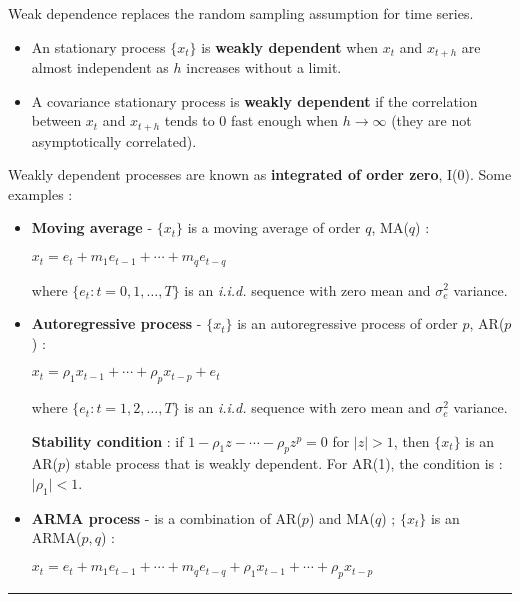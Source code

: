   \begin{f}

Weak dependence replaces the random sampling assumption for time series.

\begin{itemize}[leftmargin=*]
	\item An stationary process $\lbrace x_{t} \rbrace$ is \textbf{weakly dependent} when $x_{t}$ and $x_{t + h}$ are almost independent as $h$ increases without a limit.
	\item A covariance stationary process is \textbf{weakly dependent} if the correlation between $x_{t}$ and $x_{t + h}$ tends to $0$ fast enough when $h \rightarrow \infty$ (they are not asymptotically correlated).
\end{itemize}

Weakly dependent processes are known as \textbf{integrated of order zero}, I(0). Some examples :

\begin{itemize}[leftmargin=*]
\item \textbf{Moving average} - $\lbrace x_{t} \rbrace$ is a moving average of order $q$, MA($q$) :

\begin{center}
	$x_{t} = e_{t} + m_{1} e_{t - 1} + \cdots + m_{q} e_{t - q}$
\end{center}

where $\lbrace e_{t} : t = 0, 1, \ldots, T \rbrace$ is an \textsl{i.i.d.} sequence with zero mean and $\sigma^{2}_{e}$ variance.

\item \textbf{Autoregressive process} - $\lbrace x_{t} \rbrace$ is an autoregressive process of order $p$, AR($p$) :

\begin{center}
	$x_{t} = \rho_{1} x_{t - 1} + \cdots + \rho_{p} x_{t - p} + e_{t}$
\end{center}

where $\lbrace e_{t} : t = 1, 2, \ldots, T \rbrace$ is an \textsl{i.i.d.} sequence with zero mean and $\sigma^{2}_{e}$ variance.

\textbf{Stability condition} : if $1 - \rho_{1} z - \cdots - \rho_{p} z^{p} = 0$ for $\lvert z \rvert > 1$, then $\lbrace x_{t} \rbrace$ is an AR($p$) stable process that is weakly dependent. For AR(1), the condition is : $\lvert \rho_{1} \rvert < 1$.

\item \textbf{ARMA process} - is a combination of AR($p$) and MA($q$) ; $\lbrace x_{t} \rbrace$ is an ARMA($p, q$) :

\begin{center}
	$x_{t} = e_{t} + m_{1} e_{t - 1} + \cdots + m_{q} e_{t - q} + \rho_{1} x_{t - 1} + \cdots + \rho_{p} x_{t - p}$
\end{center}
\end{itemize}


		\end{f}  \hrule

